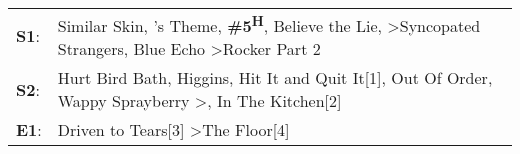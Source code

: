 \begin{supertabular}{p{0.03\textwidth}p{0.92\textwidth}}
 \textbf{S1}:  &  Similar Skin\textsuperscript{}, 's Theme\textsuperscript{}, \enspace \textbf{\#5\textsuperscript{H}}, \enspace Believe the Lie\textsuperscript{}, \textsuperscript{} \textgreater \enspace Syncopated Strangers\textsuperscript{}, \enspace Blue Echo\textsuperscript{} \textgreater \enspace Rocker Part 2\textsuperscript{}  \enspace  \\
 \textbf{S2}:  &                                                Hurt Bird Bath\textsuperscript{}, \enspace Higgins\textsuperscript{}, \enspace Hit It and Quit It[1]\textsuperscript{}, \enspace Out Of Order\textsuperscript{}, \enspace Wappy Sprayberry\textsuperscript{} \textgreater {}\textsuperscript{}, \enspace In The Kitchen[2]\textsuperscript{}  \enspace  \\
 \textbf{E1}:  &                                                                                                                                                                                                                                                              Driven to Tears[3]\textsuperscript{} \textgreater \enspace The Floor[4]\textsuperscript{}  \enspace  \\
\end{supertabular}
